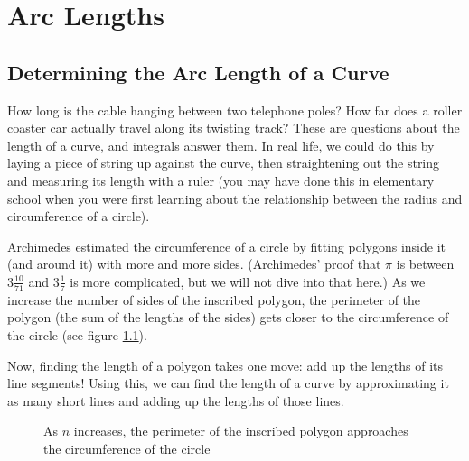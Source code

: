 \chapter{Arc Lengths}

\section{Determining the Arc Length of a Curve}

How long is the cable hanging between two telephone poles? How far does a
roller coaster car actually travel along its twisting track? These are
questions about the length of a curve, and integrals answer them. In 
real life, we could do this by laying a piece of string up against 
the curve, then straightening out the string and measuring its length 
with a ruler (you may have done this in elementary school when you 
were first learning about the relationship between the radius and 
circumference of a circle). 

Archimedes estimated the circumference of 
a circle by fitting polygons inside it (and around it) with more and more 
sides. (Archimedes' proof that $\pi$ is between $3 \frac{10}{71}$ 
and $3 \frac{1}{7}$ is more complicated, but we will not dive into that 
here.) As we increase the number of sides of the inscribed polygon, 
the perimeter of the polygon (the sum of the lengths of the sides) 
gets closer to the circumference of the circle (see figure 
\ref{fig:circles}). 

Now, finding the length of a polygon takes one move: 
add up the lengths of its line segments! Using this, we can find 
the length of a curve by approximating it as many short lines and 
adding up the lengths of those lines. 
\begin{figure}[H]
\centering
    \caption{As $n$ increases, the perimeter of the inscribed polygon 
    approaches the circumference of the circle}
    \label{fig:circles}
\end{figure}

